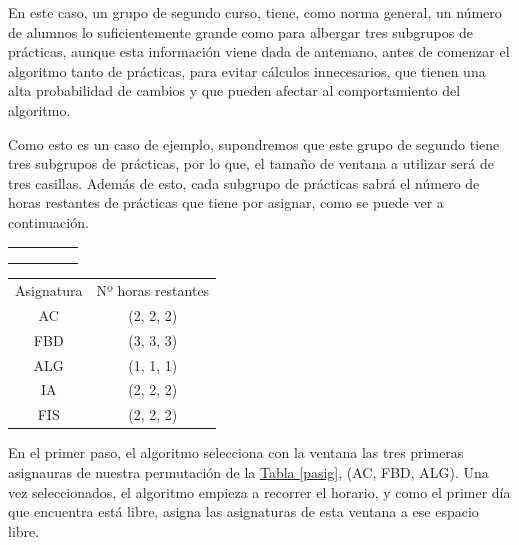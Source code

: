 En este caso, un grupo de segundo curso, tiene, como norma general, un número de alumnos lo suficientemente grande como para albergar tres subgrupos de prácticas, aunque esta información viene dada de antemano, antes de comenzar el algoritmo tanto de prácticas, para evitar cálculos innecesarios, que tienen una alta probabilidad de cambios y que pueden afectar al comportamiento del algoritmo.

Como esto es un caso de ejemplo, supondremos que este grupo de segundo tiene tres subgrupos de prácticas, por lo que, el tamaño de ventana a utilizar será de tres casillas. Además de esto, cada subgrupo de prácticas sabrá el número de horas restantes de prácticas que tiene por asignar, como se puede ver a continuación.

\begin{minipage}{0.5\textwidth}    
\begin{tabular}{| c | c | c | c | c |}
\hline
 &  &  &  & \\
 \hline
 &  &  &  & \\
 \hline
 &  &  &  & \\
 \hline
 &  &  &  & \\
 \hline 
\end{tabular}
\end{minipage}
\begin{minipage}{0.5\textwidth}
\begin{tabular}{c | c}
Asignatura & Nº horas restantes \\
AC & (2, 2, 2) \\
FBD & (3, 3, 3) \\
ALG & (1, 1, 1) \\
IA & (2, 2, 2) \\
FIS & (2, 2, 2)
\end{tabular}
\end{minipage}

En el primer paso, el algoritmo selecciona con la ventana las tres primeras asignauras de nuestra permutación de la \hyperref[pasig]{Tabla \ref*{pasig}}, (AC, FBD, ALG). Una vez seleccionados, el algoritmo empieza a recorrer el horario, y como el primer día que encuentra está libre, asigna las asignaturas de esta ventana a ese espacio libre.


